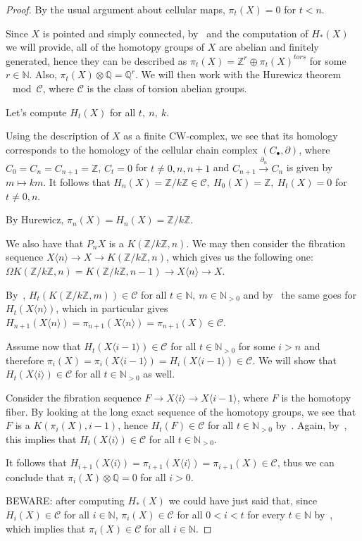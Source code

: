 \documentclass{article}
\newcommand{\numberset}{\mathbb}
\newcommand{\N}{\numberset{N}}
\newcommand{\Z}{\numberset{Z}}
\newcommand{\Q}{\numberset{Q}}
\begin{document}
\begin{proof}    
    By the usual argument about cellular maps, $\pi_t(X)=0$ for $t<n$.
    
    Since $X$ is pointed and simply connected, by~\cite[thm. 12.1]{HM19} and the
    computation of $H_*(X)$ we will provide,
    all of the homotopy groups of $X$ are abelian and finitely generated, hence
    they can be described as $\pi_t(X)=\Z^r\oplus\pi_t(X)^{tors}$ for some
    $r\in\N$. Also, $\pi_t(X)\otimes\Q=\Q^r$. We will then work with the
    Hurewicz theorem$\mod\mathcal{C}$, where $\mathcal{C}$ is the class of
    torsion abelian groups.
    
    Let's compute $H_t(X)$ for all $t,\ n,\ k$.

    Using the description of $X$ as a finite CW-complex, we see that its
    homology corresponds to the homology of the cellular chain complex
    $(C_\bullet,\partial)$, where $C_0=C_n=C_{n+1}=\Z$, $C_t=0$ for
    $t\neq 0,n,n+1$ and $C_{n+1}\xrightarrow{\partial_n}C_n$ is given by
    $m\mapsto km$. It follows that $H_n(X)=\Z/k\Z\in\mathcal{C},\ H_0(X)=\Z,\
    H_t(X)=0$ for $t\neq 0,n$.

    By Hurewicz, $\pi_n(X)=H_n(X)=\Z/k\Z$.

    We also have that $P_nX$ is a $K(\Z/k\Z,n)$. We may then consider the
    fibration sequence $X\langle n\rangle\rightarrow X\rightarrow K(\Z/k\Z,n)$,
    which gives us the following one: $\Omega
    K(\Z/k\Z,n)=K(\Z/k\Z,n-1)\rightarrow X\langle n\rangle\rightarrow X$.

    By~\cite[lemma 13.16]{HM19}, $H_t(K(\Z/k\Z,m))\in\mathcal{C}$ for all
    $t\in\N,\ m\in\N_{>0}$ and by~\cite[lemma 13.15]{HM19} the same goes for
    $H_t(X\langle n\rangle)$, which in particular gives
    $H_{n+1}(X\langle n\rangle)=\pi_{n+1}(X\langle
    n\rangle)=\pi_{n+1}(X)\in\mathcal{C}$.

    Assume now that $H_t(X\langle i-1\rangle)\in\mathcal{C}$ for all
    $t\in\N_{>0}$ for some $i>n$ and therefore $\pi_i(X)=\pi_i(X\langle
    i-1\rangle)=H_i(X\langle i-1\rangle)\in\mathcal{C}$. We will show that
    $H_t(X\langle i\rangle)\in\mathcal{C}$ for all $t\in\N_{>0}$ as well.

    Consider the fibration sequence $F\rightarrow X\langle i\rangle\rightarrow
    X\langle i-1\rangle$, where $F$ is the homotopy fiber. By looking at the
    long exact sequence of the homotopy groups, we see that $F$ is a
    $K(\pi_i(X),i-1)$, hence $H_t(F)\in\mathcal{C}$ for all $t\in\N_{>0}$
    by~\cite[lemma 13.16]{HM19}. Again, by~\cite[lemma 13.15]{HM19}, this
    implies that $H_t(X\langle i\rangle)\in\mathcal{C}$ for all $t\in\N_{>0}$.
    
    It follows that $H_{i+1}(X\langle i\rangle)=\pi_{i+1}(X\langle
    i\rangle)=\pi_{i+1}(X)\in\mathcal{C}$, thus we can conclude that
    $\pi_i(X)\otimes\Q=0$ for all $i>0$.

    BEWARE: after computing $H_*(X)$ we could have just said that, since
    $H_i(X)\in\mathcal{C}$ for all $i\in\N$, $\pi_i(X)\in\mathcal{C}$ for all
    $0<i<t$ for every $t\in\N$ by~\cite[thm. 13.17]{HM19}, which implies that
    $\pi_i(X)\in\mathcal{C}$ for all $i\in\N$.
\end{proof}

\printbibliography
\end{document}
